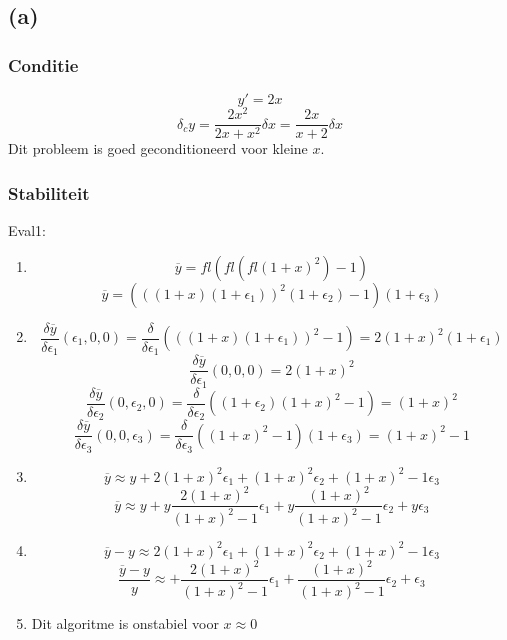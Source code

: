 \documentclass[12pt,a4paper]{article}
\begin{document}
\subsection{(a)}
\subsubsection{Conditie}
\[
y' = 2x
\]
\[
\delta_cy = \frac{2x^2}{2x+x^2}\delta x = \frac{2x}{x + 2}\delta x
\]
Dit probleem is goed geconditioneerd voor kleine $x$.

\subsubsection{Stabiliteit}
Eval1:
\begin{enumerate}
\item
\[
\overline{y} = fl\left(fl\left(fl(1+x)^2\right)-1\right)
\]
\[
\overline{y} = (((1+x)(1+\epsilon_1))^2(1+\epsilon_2) - 1)(1+\epsilon_3)
\]

\item
\[
\frac{\delta\overline{y}}{\delta\epsilon_1}(\epsilon_1,0,0)
= \frac{\delta}{\delta\epsilon_1}(((1+x)(1+\epsilon_1))^2-1)
= 2(1+x)^2(1+\epsilon_1)
\]
\[
\frac{\delta\overline{y}}{\delta\epsilon_1}(0,0,0)
= 2(1+x)^2 
\]
\[
\frac{\delta\overline{y}}{\delta\epsilon_2}(0,\epsilon_2,0)
= \frac{\delta}{\delta\epsilon_2}((1+\epsilon_2)(1+x)^2-1)
= (1+x)^2 
\]
\[
\frac{\delta\overline{y}}{\delta\epsilon_3}(0,0,\epsilon_3)
= \frac{\delta}{\delta\epsilon_3}((1+x)^2-1)(1+\epsilon_3)
= (1+x)^2-1
\]

\item
\[
\overline{y} \approx y
+ 2(1+x)^2  \epsilon_1
+ (1+x)^2   \epsilon_2
+ (1+x)^2-1 \epsilon_3
\]
\[
\overline{y} \approx y
+ y\frac{2(1+x)^2}{(1+x)^2-1}  \epsilon_1
+ y\frac{(1+x)^2}{(1+x)^2-1}   \epsilon_2
+ y \epsilon_3
\]

\item
\[
\overline{y} - y \approx
  2(1+x)^2  \epsilon_1
+ (1+x)^2   \epsilon_2
+ (1+x)^2-1 \epsilon_3
\]
\[
\frac{\overline{y}-y}{y} \approx
+ \frac{2(1+x)^2}{(1+x)^2-1}  \epsilon_1
+ \frac{(1+x)^2}{(1+x)^2-1}   \epsilon_2
+ \epsilon_3
\]

\item
Dit algoritme is onstabiel voor $x\approx 0$

\end{enumerate}
\end{document}
